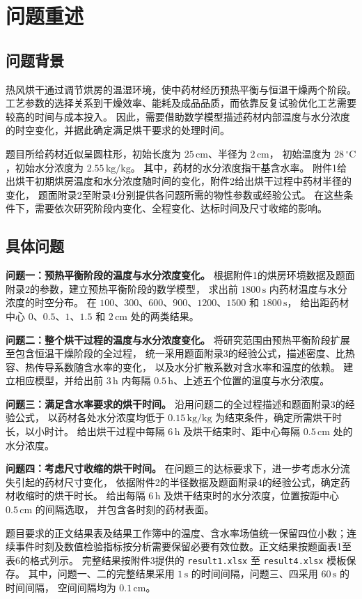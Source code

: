 \section{问题重述}

\subsection{问题背景}

热风烘干通过调节烘房的温湿环境，使中药材经历预热平衡与恒温干燥两个阶段。
工艺参数的选择关系到干燥效率、能耗及成品品质，而依靠反复试验优化工艺需要较高的时间与成本投入。
因此，需要借助数学模型描述药材内部温度与水分浓度的时空变化，并据此确定满足烘干要求的处理时间。

题目所给药材近似呈圆柱形，初始长度为 $25\,\mathrm{cm}$、半径为 $2\,\mathrm{cm}$，
初始温度为 $28\,{}^\circ\mathrm{C}$，初始水分浓度为 $2.55\,\mathrm{kg/kg}$。
其中，药材的水分浓度指干基含水率。
附件1给出烘干初期烘房温度和水分浓度随时间的变化，附件2给出烘干过程中药材半径的变化，
题面附录2至附录4分别提供各问题所需的物性参数或经验公式。
在这些条件下，需要依次研究阶段内变化、全程变化、达标时间及尺寸收缩的影响。

\subsection{具体问题}

\textbf{问题一：预热平衡阶段的温度与水分浓度变化。}
根据附件1的烘房环境数据及题面附录2的参数，建立预热平衡阶段的数学模型，
求出前 $1800\,\mathrm{s}$ 内药材温度与水分浓度的时空分布。
在 $100$、$300$、$600$、$900$、$1200$、$1500$ 和 $1800\,\mathrm{s}$，
给出距药材中心 $0$、$0.5$、$1$、$1.5$ 和 $2\,\mathrm{cm}$ 处的两类结果。

\textbf{问题二：整个烘干过程的温度与水分浓度变化。}
将研究范围由预热平衡阶段扩展至包含恒温干燥阶段的全过程，
统一采用题面附录3的经验公式，描述密度、比热容、热传导系数随含水率的变化，
以及水分扩散系数对含水率和温度的依赖。
建立相应模型，并给出前 $3\,\mathrm{h}$ 内每隔 $0.5\,\mathrm{h}$、上述五个位置的温度与水分浓度。

\textbf{问题三：满足含水率要求的烘干时间。}
沿用问题二的全过程描述和题面附录3的经验公式，
以药材各处水分浓度均低于 $0.15\,\mathrm{kg/kg}$ 为结束条件，确定所需烘干时长，以小时计。
给出烘干过程中每隔 $6\,\mathrm{h}$ 及烘干结束时、距中心每隔 $0.5\,\mathrm{cm}$ 处的水分浓度。

\textbf{问题四：考虑尺寸收缩的烘干时间。}
在问题三的达标要求下，进一步考虑水分流失引起的药材尺寸变化，
依据附件2的半径数据及题面附录4的经验公式，确定药材收缩时的烘干时长。
给出每隔 $6\,\mathrm{h}$ 及烘干结束时的水分浓度，位置按距中心 $0.5\,\mathrm{cm}$ 的间隔选取，
并包含各时刻的药材表面。

题目要求的正文结果表及结果工作簿中的温度、含水率场值统一保留四位小数；连续事件时刻及数值检验指标按分析需要保留必要有效位数。正文结果按题面表1至表6的格式列示。
完整结果按附件3提供的 \texttt{result1.xlsx} 至 \texttt{result4.xlsx} 模板保存。
其中，问题一、二的完整结果采用 $1\,\mathrm{s}$ 的时间间隔，问题三、四采用 $60\,\mathrm{s}$ 的时间间隔，
空间间隔均为 $0.1\,\mathrm{cm}$。
